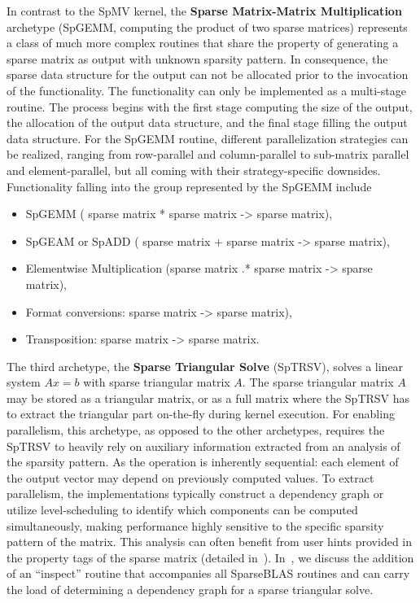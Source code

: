 \documentclass[manuscript,review]{acmart}
\begin{document}
In contrast to the SpMV kernel, the \textbf{Sparse Matrix-Matrix Multiplication} archetype (SpGEMM, computing the product of two sparse matrices) represents a class of much more complex routines that share the property of generating a sparse matrix as output with unknown sparsity pattern. In consequence, the sparse data structure for the output can not be allocated prior to the invocation of the functionality. The functionality can only be implemented as a multi-stage routine. The process begins with the first stage computing the size of the output, the allocation of the output data structure, and the final stage filling the output data structure.
For the SpGEMM routine, different parallelization strategies can be realized, ranging from row-parallel and column-parallel to sub-matrix parallel and element-parallel, but all coming with their strategy-specific downsides. Functionality falling into the group represented by the SpGEMM include
\begin{itemize}
\item SpGEMM (  sparse matrix * sparse matrix -> sparse matrix),
\item SpGEAM or SpADD ( sparse matrix + sparse matrix -> sparse matrix),
\item Elementwise Multiplication  (sparse matrix .* sparse matrix ->  sparse matrix),
\item Format conversions:  sparse matrix -> sparse matrix),
\item Transposition:  sparse matrix -> sparse matrix.
\end{itemize}

The third archetype, the \textbf{Sparse Triangular Solve} (SpTRSV), solves a linear system $Ax=b$ with sparse triangular matrix $A$. The sparse triangular matrix $A$ may be stored as a triangular matrix, or as a full matrix where the SpTRSV has to extract the triangular part on-the-fly during kernel execution.   For enabling parallelism, this archetype, as opposed to the other archetypes, requires the SpTRSV to heavily rely on auxiliary information extracted from an analysis of the sparsity pattern. As the operation is inherently sequential: each element of the output vector may depend on previously computed values.  To extract parallelism, the implementations typically construct a dependency graph or utilize level-scheduling to identify which components can be computed simultaneously, making performance highly sensitive to the specific sparsity pattern of the matrix.  This analysis can often benefit from user hints provided in the property tags of the sparse matrix (detailed in~).
In~, we discuss the addition of an ``inspect'' routine that accompanies all SparseBLAS routines and can carry the load of determining a dependency graph for a sparse triangular solve.
\end{document}
